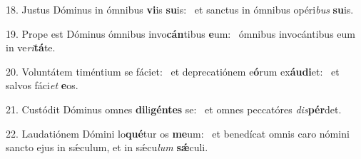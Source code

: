18. Justus Dóminus in ómnibus \textbf{vi}is \textbf{su}is: \ast\  et sanctus in ómnibus opéri\textit{bus} \textbf{su}is.\

19. Prope est Dóminus ómnibus invo\textbf{cán}tibus \textbf{e}um: \ast\  ómnibus invocántibus eum in ve\textit{ri}\textbf{tá}te.\

20. Voluntátem timéntium se fáciet: \dag\  et deprecatiónem e\textbf{ó}rum ex\textbf{áu}\textbf{di}et: \ast\  et salvos fáci\textit{et} \textbf{e}os.\

21. Custódit Dóminus omnes \textbf{di}li\textbf{gén}\textbf{tes} se: \ast\  et omnes peccatóres \textit{dis}\textbf{pér}det.\

22. Laudatiónem Dómini lo\textbf{qué}tur os \textbf{me}um: \ast\  et benedícat omnis caro nómini sancto ejus in sǽculum, et in sǽcu\textit{lum} \textbf{sǽ}culi.\

